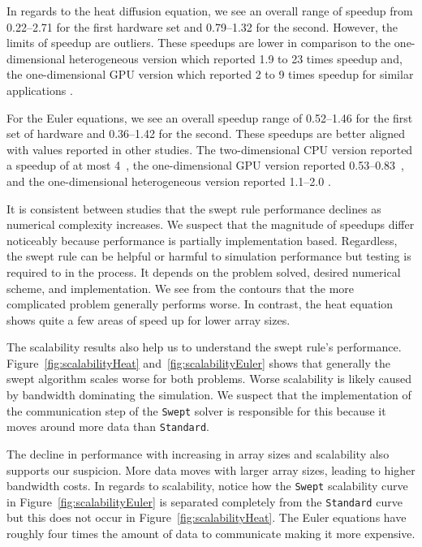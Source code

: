 \documentclass[preprints,article,accept,moreauthors,pdftex]{Definitions/mdpi}
\def\Swept{\texttt{Swept}}
\def\Standard{\texttt{Standard}}
\begin{document}
In regards to the heat diffusion equation, we see an overall range of speedup from 0.22--2.71 for the first hardware set and 0.79--1.32 for the second. However, the limits of speedup are outliers. These speedups are lower in comparison to the one-dimensional heterogeneous version which reported 1.9 to 23 times speedup \cite{Magee2020ApplyingSystems} and, the one-dimensional GPU version which reported 2 to 9 times speedup for similar applications \cite{Magee2018AcceleratingDecomposition}. 

For the Euler equations, we see an overall speedup range of 0.52--1.46 for the first set of hardware and 0.36--1.42 for the second. 
These speedups are better aligned with values reported in other studies. 
The two-dimensional CPU version reported a speedup of at most 4~\cite{Alhubail2018ThePDEs}, the one-dimensional GPU version reported 0.53--0.83~\cite{Magee2018AcceleratingDecomposition}, and the one-dimensional heterogeneous version reported 1.1--2.0 \cite{Magee2020ApplyingSystems}.

It is consistent between studies that the swept rule performance declines as numerical complexity increases. We suspect that the magnitude of speedups differ noticeably because performance is partially implementation based. Regardless, the swept rule can be helpful or harmful to simulation performance but testing is required to in the process. It depends on the problem solved, desired numerical scheme, and implementation.  
We see from the contours that the more complicated problem generally performs worse. In contrast, the heat equation shows quite a few areas of speed up for lower array sizes. 

The scalability results also help us to understand the swept rule's performance.
Figure~\ref{fig:scalabilityHeat} and~\ref{fig:scalabilityEuler} shows that generally the swept algorithm scales worse for both problems. Worse scalability is likely caused by bandwidth dominating the simulation. 
We suspect that the implementation of the communication step of the \Swept{} solver is responsible for this because it moves around more data than \Standard{}. 

The decline in performance with increasing in array sizes and scalability also supports our suspicion.
More data moves with larger array sizes, leading to higher bandwidth costs. In regards to scalability, notice how the \Swept{} scalability curve in Figure~\ref{fig:scalabilityEuler} is separated completely from the \Standard{} curve but this does not occur in Figure~\ref{fig:scalabilityHeat}. 
The Euler equations have roughly four times the amount of data to communicate making it more expensive. 
\end{document}
